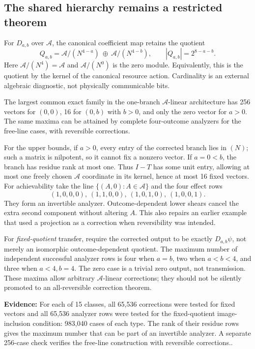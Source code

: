 \documentclass[11pt,a4paper]{article}
\theoremstyle{definition}\newtheorem{definition}[theorem]{Definition}
\newcommand{\A}{\mathcal A}
\newcommand{\ev}[1]{\textbf{Evidence:} #1.}
\begin{document}
\subsection{The shared hierarchy remains a restricted theorem}
For $D_{a,b}$ over $\A$, the canonical coefficient map retains the quotient
\begin{equation}
 Q_{a,b}=\A/(N^{4-a})\ \oplus\ \A/(N^{4-b}),
 \qquad |Q_{a,b}|=2^{8-a-b}.
 \label{eq:quotient}
\end{equation}
Here $\A/(N^4)=\A$ and $\A/(N^0)$ is the zero module. Equivalently, this is the quotient by the kernel of the canonical resource action. Cardinality is an external algebraic diagnostic, not physically communicable bits.

The largest common exact family in the one-branch $\A$-linear architecture has 256 vectors for $(0,0)$, 16 for $(0,b)$ with $b>0$, and only the zero vector for $a>0$. The same maxima can be attained by complete four-outcome analyzers for the free-line cases, with reversible corrections.

For the upper bounds, if $a>0$, every entry of the corrected branch lies in $(N)$; such a matrix is nilpotent, so it cannot fix a nonzero vector. If $a=0<b$, the branch has residue rank at most one. Thus $I-T$ has some unit entry, allowing at most one freely chosen $\A$ coordinate in its kernel, hence at most 16 fixed vectors. For achievability take the line $\{(A,0):A\in\A\}$ and the four effect rows
\[
 (1,0,0,0),\ (1,1,0,0),\ (1,0,1,0),\ (1,0,0,1).
\]
They form an invertible analyzer. Outcome-dependent lower shears cancel the extra second component without altering $A$. This also repairs an earlier example that used a projection as a correction when reversibility was intended.

For \emph{fixed-quotient} transfer, require the corrected output to be exactly $D_{a,b}\psi$, not merely an isomorphic outcome-dependent quotient. The maximum number of independent successful analyzer rows is four when $a=b$, two when $a<b<4$, and three when $a<4,b=4$. The zero case is a trivial zero output, not transmission. These maxima allow arbitrary $\A$-linear corrections; they should not be silently promoted to an all-reversible correction theorem.

\ev{For each of 15 classes, all 65,536 corrections were tested for fixed vectors and all 65,536 analyzer rows were tested for the fixed-quotient image-inclusion condition: 983,040 cases of each type. The rank of their residue rows gives the maximum number that can be part of an invertible analyzer. A separate 256-case check verifies the free-line construction with reversible corrections.}
\end{document}
